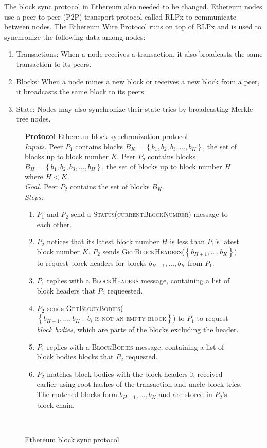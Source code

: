 \documentclass[12pt]{article}
\makeatletter
\newcounter{protocol}
\newenvironment{protocol}[1]
  {\par\addvspace{\topsep}
   \noindent
   \tabularx{\linewidth}{@{} X @{}}
    \hline
    \refstepcounter{protocol}\textbf{Protocol \theprotocol} #1 \\
    \hline}
  { \\
    \hline
   \endtabularx
   \par\addvspace{\topsep}}
\newcommand{\sbline}{\\[.5\normalbaselineskip]}%
\newcommand{\set}[1]{\left\{#1\right\}}
\newcommand{\setc}[2]{\left\{#1 \; :\; #2 \right\}}
\makeatother
\begin{document}
The block sync protocol in Ethereum also needed to be changed. Ethereum nodes use a peer-to-peer (P2P) transport protocol called RLPx to communicate between nodes. The Ethereum Wire Protocol runs on top of RLPx and is used to synchronize the following data among nodes:
\begin{enumerate}
  \item Transactions: When a node receives a transaction, it also broadcasts the same transaction to its peers.
  \item Blocks: When a node mines a new block or receives a new block from a peer, it broadcasts the same block to its peers.
  \item State: Nodes may also synchronize their state tries by broadcasting Merkle tree nodes.
\end{enumerate}


\begin{figure}[H]
  \begin{protocol}{Ethereum block synchronization protocol}
    \emph{Inputs.} Peer $P_1$ contains blocks $B_K = \set{b_{1}, b_{2}, b_{3}, \ldots, b_{K}}$, the set of blocks up to block number $K$. Peer $P_2$ contains blocks $B_H = \set{b_{1}, b_{2}, b_{3}, \ldots, b_{H}}$, the set of blocks up to block number $H$ where $H < K$.
    \sbline
    \emph{Goal.} Peer $P_2$ contains the set of blocks $B_K$.
    \sbline
    \emph{Steps:}
    \begin{enumerate}
      \item $P_1$ and $P_2$ send a \textsc{Status(currentBlockNumber)} message to each other.
      \item $P_2$ notices that its latest block number $H$ is less than $P_1$'s latest block number $K$. $P_2$ sends \textsc{GetBlockHeaders($\set{b_{H+1}, \ldots, b_{K}}$)} to request block headers for blocks $b_{H + 1}, \ldots, b_{K}$ from $P_1$. \label{syncprotocol:requestBlockHeaders}
      \item $P_1$ replies with a \textsc{BlockHeaders} message, containing a list of block headers that $P_2$ requeested. \label{syncprotocol:replyBlockHeaders}
      \item $P_2$ sends \textsc{GetBlockBodies($\setc{b_{H+1}, \ldots, b_{K}}{\text{$b_i$ is not an empty block}}$)} to $P_1$ to request \emph{block bodies}, which are parts of the blocks excluding the header. \label{syncprotocol:requestBlockBodies}
      \item $P_1$ replies with a \textsc{BlockBodies} message, containing a list of block bodies blocks that $P_2$ requested. \label{syncprotocol:replyBlockBodies}
      \item $P_2$ matches block bodies with the block headers it received earlier using root hashes of the transaction and uncle block tries. The matched blocks form $b_{H + 1}, \ldots, b_{K}$ and are stored in $P_2$'s block chain. \label{syncprotocol:reconstruct}
    \end{enumerate}
  \end{protocol}
  \caption{Ethereum block sync protocol.} \label{syncprotocol}
\end{figure}
\end{document}
